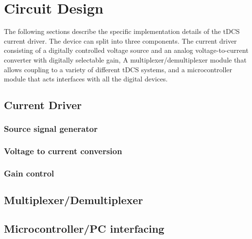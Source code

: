 

\section{Circuit Design}

The following sections describe the specific implementation details of the tDCS current driver. The device can split into three components. The current driver consisting of a digitally controlled voltage source and an analog voltage-to-current converter with digitally selectable gain, A multiplexer/demultiplexer module that allows coupling to a variety of different tDCS systems, and a microcontroller module that acts interfaces with all the digital devices. 

\subsection{Current Driver}
\subsubsection{Source signal generator}

\subsubsection{Voltage to current conversion}


\subsubsection{Gain control}


\subsection{Multiplexer/Demultiplexer}

\subsection{Microcontroller/PC interfacing}




